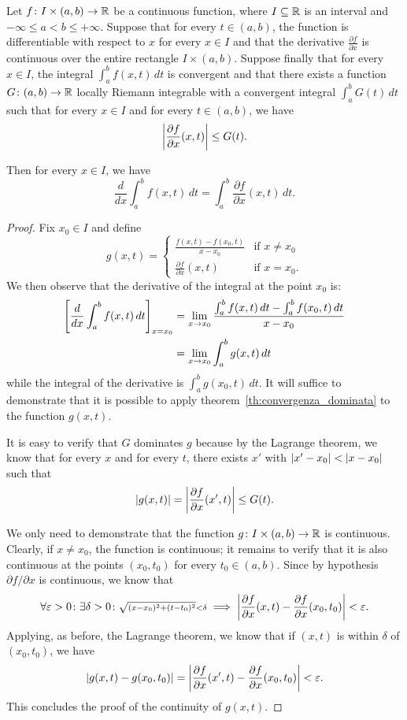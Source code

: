 \begin{theorem}%
  \mymark{**}%
  \label{th:derivata_integrale}%
%
Let $f\colon I\times(a,b)\to {\mathbb R}$ be a continuous function, 
where $I\subseteq {\mathbb R}$ is an interval and $-\infty \le a < b \le +\infty$.
Suppose that for every $t\in (a,b)$, the function is differentiable with respect
to $x$
for every $x\in I$
and that the derivative $\frac{\partial f}{\partial x}$ is continuous over the
entire rectangle
$I\times(a,b)$.
Suppose finally that for every $x\in I$, the integral
$\int_a^b f(x,t)\, dt$ is convergent and that
there exists a function $G\colon(a,b)\to {\mathbb R}$ locally Riemann integrable 
with a convergent integral $\int_a^b G(t)\, dt$ such that for every $x\in I$ 
and for every $t\in (a,b)$, we have 
\[
  {\left|\frac{\partial f}{\partial x}(x,t)\right|} \le G(t).
\]

Then for every $x\in I$, we have
\[
  \frac{d}{dx} \int_a^b f(x,t)\, dt = \int_a^b \frac{\partial f}{\partial x}(x,t)\, dt.  
\]
\end{theorem}
%
\begin{proof}
Fix $x_0\in I$ and define 
\[
 g(x,t) = \begin{cases}
 \frac{f(x,t) - f(x_0,t)}{x-x_0} &\text{if $x\neq x_0$}\\
 \frac{\partial f}{\partial x}(x,t) & \text{if $x = x_0$}.
\end{cases}  
\]
We then observe that the derivative of the integral at the point $x_0$ 
is:
\begin{align*}
    {\left[ \frac{d}{dx} \int_a^b f(x,t)\, dt \right]}_{x=x_0}
    &= \lim_{x\to x_0} \frac{\int_a^b f(x,t)\, dt - \int_a^b f(x_0,t)\, dt
  }{x-x_0}\\
  &= \lim_{x\to x_0} \int_a^b g(x,t)\, dt  
\end{align*}
while the integral of the derivative is 
$\int_a^b g(x_0,t)\, dt.$
It will suffice to demonstrate that it is possible to apply
theorem~\ref{th:convergenza_dominata}
to the function $g(x,t)$.

It is easy to verify that $G$ dominates $g$ because by the Lagrange theorem, we
know
that for every $x$ and for every $t$, there exists $x'$ with
${\left|x'-x_0\right|}<{\left|x-x_0\right|}$ such that
\[
  {\left|g(x,t)\right|} = {\left|\frac{\partial f}{\partial x}(x',t)\right|} \le G(t).
\]

We only need to demonstrate that the function $g\colon I\times (a,b)\to {\mathbb R}$ 
is continuous. 
Clearly, if $x\neq x_0$, the function is continuous; it remains to verify that
it is also continuous at the points $(x_0,t_0)$ for every $t_0\in (a,b)$.
Since by hypothesis $\partial f / \partial x$ is continuous, we know 
that 
\[
  \forall \varepsilon>0 \colon \exists \delta>0\colon 
  {\scriptstyle\sqrt{(x-x_0)^2+(t-t_0)^2}<\delta} 
  \implies {\left|\frac{\partial f}{\partial x}(x,t) - \frac{\partial f}{\partial x}(x_0,t_0)\right|}<\varepsilon.
\]
Applying, as before, the Lagrange theorem, we know that if $(x,t)$ is within
$\delta$ of $(x_0,t_0)$, we have
\[
{\left|g(x,t) - g(x_0,t_0)\right|} 
= {\left|\frac{\partial f}{\partial x}(x',t) - \frac{\partial f}{\partial
x}(x_0,t_0)\right|}
 < \varepsilon.
\]
This concludes the proof of the continuity of $g(x,t)$.
\end{proof}

